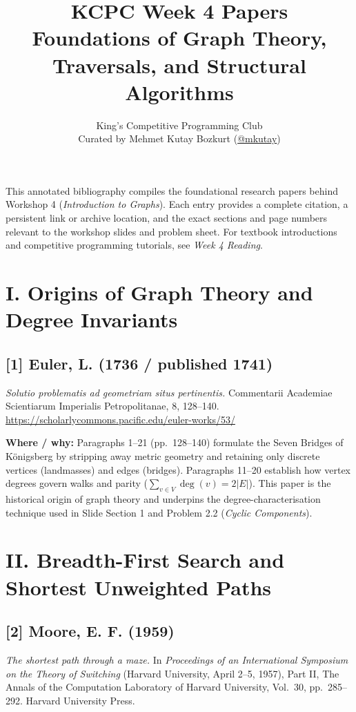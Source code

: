 \documentclass[11pt]{article}
\title{KCPC Week 4 Papers\\Foundations of Graph Theory, Traversals, and Structural Algorithms}
\author{King's Competitive Programming Club\\
  \small Curated by Mehmet Kutay Bozkurt (\href{https://github.com/mkutay}{@mkutay})}
\date{}
\begin{document}
\maketitle
\thispagestyle{fancy}

\noindent
This annotated bibliography compiles the foundational research papers behind Workshop 4 (\textit{Introduction to Graphs}). Each entry provides a complete citation, a persistent link or archive location, and the exact sections and page numbers relevant to the workshop slides and problem sheet. For textbook introductions and competitive programming tutorials, see \emph{Week 4 Reading}.

\section*{I. Origins of Graph Theory and Degree Invariants}

\subsection*{[1] Euler, L. (1736 / published 1741)}
\textit{Solutio problematis ad geometriam situs pertinentis.}
Commentarii Academiae Scientiarum Imperialis Petropolitanae, 8, 128--140.
\url{https://scholarlycommons.pacific.edu/euler-works/53/}

\textbf{Where / why:}
Paragraphs 1--21 (pp.~128--140) formulate the Seven Bridges of K{\"o}nigsberg by stripping away metric geometry and retaining only discrete vertices (landmasses) and edges (bridges). Paragraphs 11--20 establish how vertex degrees govern walks and parity ($\sum_{v \in V} \deg(v) = 2|E|$). This paper is the historical origin of graph theory and underpins the degree-characterisation technique used in Slide Section 1 and Problem 2.2 (\emph{Cyclic Components}).

\section*{II. Breadth-First Search and Shortest Unweighted Paths}

\subsection*{[2] Moore, E. F. (1959)}
\textit{The shortest path through a maze.}
In \textit{Proceedings of an International Symposium on the Theory of Switching} (Harvard University, April 2--5, 1957), Part II, The Annals of the Computation Laboratory of Harvard University, Vol.~30, pp.~285--292. Harvard University Press.
\end{document}
